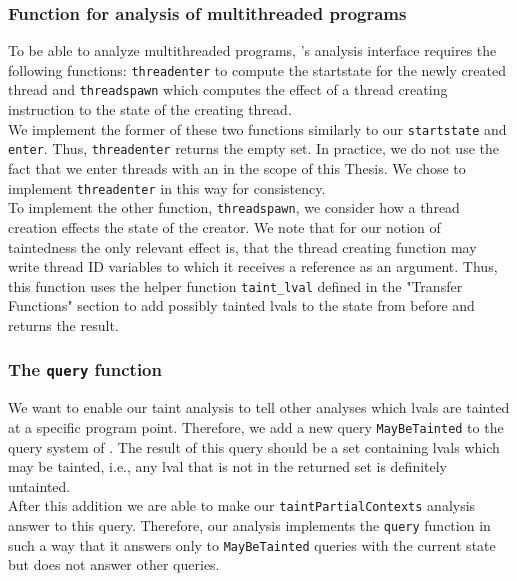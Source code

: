       \subsubsection{Function for analysis of multithreaded programs}
        To be able to analyze multithreaded programs, \gob's analysis interface requires the following functions: \texttt{threadenter} to compute the startstate for the newly created thread and \texttt{threadspawn} which computes the effect of a thread creating instruction to the state of the creating thread.\\
        We implement the former of these two functions similarly to our \texttt{startstate} and \texttt{enter}. Thus, \texttt{threadenter} returns the empty set. In practice, we do not use the fact that we enter threads with an in the scope of this Thesis. We chose to implement \texttt{threadenter} in this way for consistency.\\
        To implement the other function, \texttt{threadspawn}, we consider how a thread creation effects the state of the creator. We note that for our notion of taintedness the only relevant effect is, that the thread creating function may write thread ID variables to which it receives a reference as an argument. Thus, this function uses the helper function \texttt{taint\_lval} defined in the "Transfer Functions" section to add possibly tainted \ac{lval}s to the state from before and returns the result.

      \subsubsection{The \texttt{query} function}
        We want to enable our taint analysis to tell other analyses which \ac{lval}s are tainted at a specific program point. Therefore, we add a new query \texttt{MayBeTainted} to the query system of \gob. The result of this query should be a set containing \ac{lval}s which may be tainted, i.e., any \ac{lval} that is not in the returned set is definitely untainted.\\
        After this addition we are able to make our \texttt{taintPartialContexts} analysis answer to this query. Therefore, our analysis implements the \texttt{query} function in such a way that it answers only to \texttt{MayBeTainted} queries with the current state but does not answer other queries.

